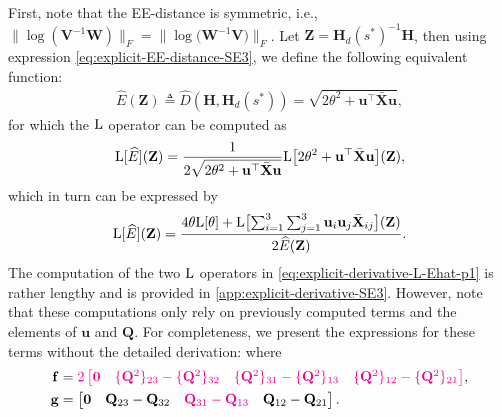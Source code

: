 First, note that the EE-distance is symmetric, i.e., $\bigl\|\log(\mathbf{V}^{-1}\mathbf{W})\bigr\|_F = \bigl\|\log\bigl(\mathbf{W}^{-1}\mathbf{V}\bigr)\bigr\|_F$. Let $\mathbf{Z}=\mathbf{H}_d(s^*)^{-1}\mathbf{H}$, then using expression \eqref{eq:explicit-EE-distance-SE3}, we define the following equivalent function:
\begin{align}
    \widehat{E}(\mathbf{Z}) \triangleq \widehat{D}(\mathbf{H}, \mathbf{H}_d(s^*)) = \sqrt{2\theta^2 + \mathbf{u}^\top\bar{\mathbf{X}}\mathbf{u}},
    \label{eq:explicit-EE-dista-SE3-component-Ehat}
\end{align}
for which the $\operatorname{L}$ operator can be computed as
\begin{align}
    \operatorname{L}[\widehat{E}](\mathbf{Z}) = \frac{1}{2 \sqrt{2\theta^2 + \mathbf{u}^\top\bar{\mathbf{X}}\mathbf{u}}}\text{L}\bigl[2\theta^2 + \mathbf{u}^\top\bar{\mathbf{X}}\mathbf{u}\bigr](\mathbf{Z}),
\end{align}
which in turn can be expressed by 
\begin{align}
    \operatorname{L}[\widehat{E}](\mathbf{Z}) = \frac{4\theta\text{L}[\theta] + \operatorname{L}\bigl[\sum_{i=1}^{3}\sum_{j=1}^{3}\mathbf{u}_i\mathbf{u}_j\bar{\mathbf{X}}_{ij}\bigr](\mathbf{Z})}{2 \widehat{E}(\mathbf{Z})}. \label{eq:explicit-derivative-L-Ehat-p1}
\end{align}
The computation of the two $\operatorname{L}$ operators in \eqref{eq:explicit-derivative-L-Ehat-p1} is rather lengthy and is provided in \cref{app:explicit-derivative-SE3}. However, note that these computations only rely on previously computed terms and the elements of $\mathbf{u}$ and $\mathbf{Q}$. For completeness, we present the expressions for these terms without the detailed derivation:
where 
\begin{align}
    \mathbf{f} &= \textcolor{magenta}{2\begin{bmatrix}
        \mathbf{0}& \{\mathbf{Q}^2\}_{23}-\{\mathbf{Q}^2\}_{32} & \{\mathbf{Q}^2\}_{31} - \{\mathbf{Q}^2\}_{13} & \{\mathbf{Q}^2\}_{12}-\{\mathbf{Q}^2\}_{21}
    \end{bmatrix}},\label{eq:explicit-EE-dista-SE3-component-fvec}\\
    \mathbf{g} &= \begin{bmatrix}
        \mathbf{0}& \mathbf{Q}_{23}-\mathbf{Q}_{32} & \textcolor{magenta}{\mathbf{Q}_{31} - \mathbf{Q}_{13}} & \mathbf{Q}_{12}-\mathbf{Q}_{21}
    \end{bmatrix} \label{eq:explicit-EE-dista-SE3-component-gvec}.
\end{align}
